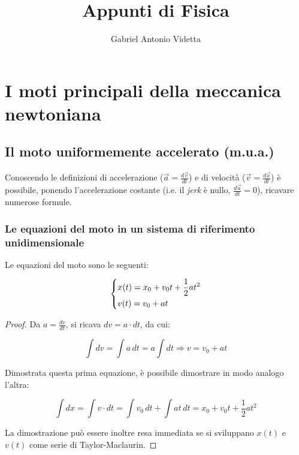 \documentclass[oneside]{book}
\begin{document}
\author{Gabriel Antonio Videtta}
\title{Appunti di Fisica}

\maketitle

\tableofcontents

\chapter{I moti principali della meccanica newtoniana}

\section{Il moto uniformemente accelerato (m.u.a.)}

Conoscendo le definizioni di accelerazione ($\vec{a} = \frac{d\vec{v}}{dt}$)
e di velocità ($\vec{v} = \frac{d\vec{x}}{dt}$) è possibile, ponendo l'accelerazione
costante (i.e. il \textit{jerk} è nullo, $\frac{d\vec{a}}{dt} = 0$), ricavare numerose formule.

\subsection{Le equazioni del moto in un sistema di riferimento unidimensionale}

Le equazioni del moto sono le seguenti:

\begin{equation}
    \begin{dcases}
        x(t)=x_0+v_0t+\frac{1}{2}at^2 \\
        v(t)=v_0+at
    \end{dcases}
    \label{eq:mua}
\end{equation}

\begin{proof}
    Da $a=\frac{dv}{dt}$, si ricava $dv=a\cdot dt$, da cui:

    \begin{equation*}
        \int dv=\int a\, dt = a \int dt \Rightarrow v=v_0+at
    \end{equation*}

    Dimostrata questa prima equazione, è possibile dimostrare in modo analogo l'altra:

    \begin{equation*}
        \int dx=\int v\cdot dt = \int v_0\, dt + \int at\, dt = x_0+v_0t+\frac12at^2
    \end{equation*}

    La dimostrazione può essere inoltre resa immediata se si sviluppano $x(t)$ e
    $v(t)$ come serie di Taylor-Maclaurin.

\end{proof}
\end{document}
